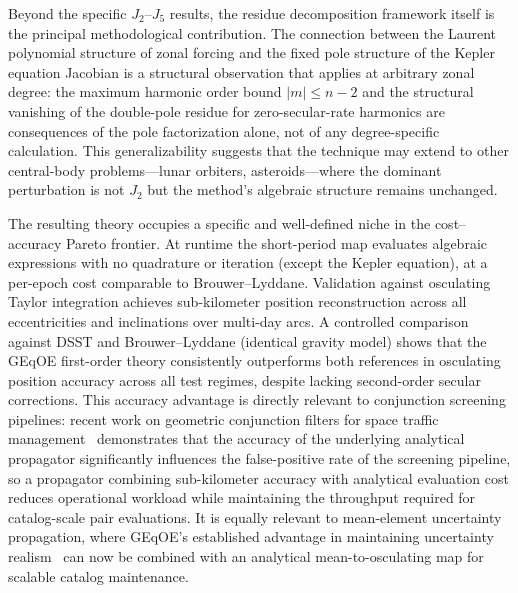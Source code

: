 Beyond the specific $J_2$--$J_5$ results, the residue decomposition
framework itself is the principal methodological contribution.  The
connection between the Laurent polynomial structure of zonal forcing and
the fixed pole structure of the Kepler equation Jacobian is a structural
observation that applies at arbitrary zonal degree: the maximum harmonic
order bound $|m| \leq n-2$ and the structural vanishing of the double-pole
residue for zero-secular-rate harmonics are consequences of the pole
factorization alone, not of any degree-specific calculation.  This
generalizability suggests that the technique may extend to other
central-body problems---lunar orbiters, asteroids---where the dominant
perturbation is not $J_2$ but the method's algebraic structure remains
unchanged.

The resulting theory occupies a specific and well-defined niche in the
cost--accuracy Pareto frontier.  At runtime the short-period map evaluates
algebraic expressions with no quadrature or iteration (except the Kepler
equation), at a per-epoch cost comparable to Brouwer--Lyddane.  Validation
against osculating Taylor integration achieves sub-kilometer position
reconstruction across all eccentricities and inclinations over multi-day
arcs.  A controlled comparison against DSST and Brouwer--Lyddane (identical
gravity model) shows that the GEqOE first-order theory consistently
outperforms both references in osculating position accuracy across all test
regimes, despite lacking second-order secular corrections.  This accuracy advantage is directly relevant to conjunction screening
pipelines: recent work on geometric conjunction filters for space traffic
management~\cite{rivero2025,rivero2025b} demonstrates that the accuracy of the
underlying analytical propagator significantly influences the false-positive
rate of the screening pipeline, so a propagator combining sub-kilometer
accuracy with analytical evaluation cost reduces operational workload while
maintaining the throughput required for catalog-scale pair evaluations.
It is equally relevant to mean-element uncertainty propagation, where
GEqOE's established advantage in maintaining uncertainty
realism~\cite{hernandoayuso2023} can now be combined with an analytical
mean-to-osculating map for scalable catalog maintenance.

